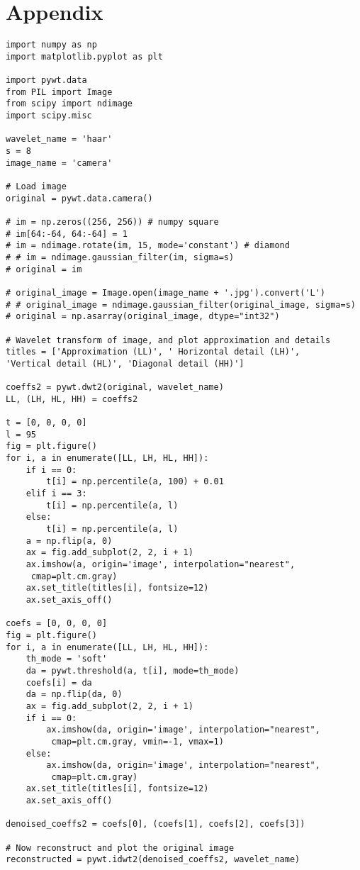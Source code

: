 \chapter*{Appendix}


\begin{lstlisting}
import numpy as np
import matplotlib.pyplot as plt

import pywt.data
from PIL import Image
from scipy import ndimage
import scipy.misc

wavelet_name = 'haar'
s = 8
image_name = 'camera'

# Load image
original = pywt.data.camera()

# im = np.zeros((256, 256)) # numpy square
# im[64:-64, 64:-64] = 1
# im = ndimage.rotate(im, 15, mode='constant') # diamond
# # im = ndimage.gaussian_filter(im, sigma=s)
# original = im

# original_image = Image.open(image_name + '.jpg').convert('L')
# # original_image = ndimage.gaussian_filter(original_image, sigma=s)
# original = np.asarray(original_image, dtype="int32")

# Wavelet transform of image, and plot approximation and details
titles = ['Approximation (LL)', ' Horizontal detail (LH)',
'Vertical detail (HL)', 'Diagonal detail (HH)']

coeffs2 = pywt.dwt2(original, wavelet_name)
LL, (LH, HL, HH) = coeffs2

t = [0, 0, 0, 0]
l = 95
fig = plt.figure()
for i, a in enumerate([LL, LH, HL, HH]):
	if i == 0:
		t[i] = np.percentile(a, 100) + 0.01
	elif i == 3:
		t[i] = np.percentile(a, l)
	else:
		t[i] = np.percentile(a, l)
	a = np.flip(a, 0)
	ax = fig.add_subplot(2, 2, i + 1)
	ax.imshow(a, origin='image', interpolation="nearest",
	 cmap=plt.cm.gray)
	ax.set_title(titles[i], fontsize=12)
	ax.set_axis_off()

coefs = [0, 0, 0, 0]
fig = plt.figure()
for i, a in enumerate([LL, LH, HL, HH]):
	th_mode = 'soft'
	da = pywt.threshold(a, t[i], mode=th_mode)
	coefs[i] = da
	da = np.flip(da, 0)
	ax = fig.add_subplot(2, 2, i + 1)
	if i == 0:
		ax.imshow(da, origin='image', interpolation="nearest", 
		 cmap=plt.cm.gray, vmin=-1, vmax=1)
	else:
		ax.imshow(da, origin='image', interpolation="nearest",
		 cmap=plt.cm.gray)
	ax.set_title(titles[i], fontsize=12)
	ax.set_axis_off()

denoised_coeffs2 = coefs[0], (coefs[1], coefs[2], coefs[3])

# Now reconstruct and plot the original image
reconstructed = pywt.idwt2(denoised_coeffs2, wavelet_name)


\end{lstlisting}
